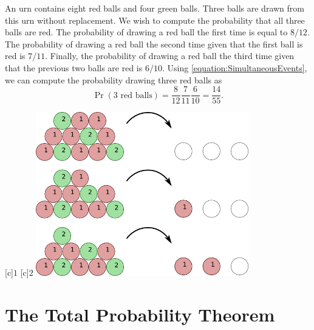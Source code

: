 \begin{example}
An urn contains eight red balls and four green balls.
Three balls are drawn from this urn without replacement.
We wish to compute the probability that all three balls are red.
The probability of drawing a red ball the first time is equal to $8/12$.
The probability of drawing a red ball the second time given that the first ball is red is $7/11$.
Finally, the probability of drawing a red ball the third time given that the previous two balls are red is $6/10$.
Using \eqref{equation:SimultaneousEvents}, we can compute the probability drawing three red balls as
\begin{equation*}
\Pr (\text{3 red balls})
= \frac{8}{12} \frac{7}{11} \frac{6}{10}
= \frac{14}{55} .
\end{equation*}

\begin{center}
\begin{psfrags}
[c]{$1$}
[c]{$2$}
\includegraphics[height=7.11cm]{Figures/3Chapter/balls}
\end{psfrags}
\end{center}
\end{example}


\section{The Total Probability Theorem}


